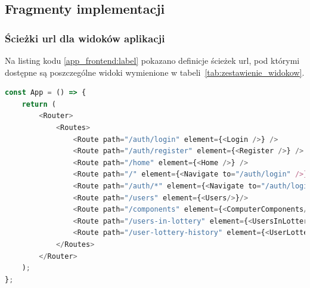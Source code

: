 \subsection{Fragmenty implementacji}
	\subsubsection{Ścieżki url dla widoków aplikacji}
	Na listing kodu \ref{app_frontend:label} pokazano definicje ścieżek url, pod którymi dostępne są poszczególne widoki wymienione w tabeli~\ref{tab:zestawienie_widokow}.
\begin{lstlisting}[language=JavaScript, style=JavaScriptStyle,  caption={Zdefiniowane ścieżki url widoków systemu }, label={app_frontend:label}]
	const App = () => {
    return (
        <Router>
            <Routes>
                <Route path="/auth/login" element={<Login />} />
                <Route path="/auth/register" element={<Register />} />
                <Route path="/home" element={<Home />} />
                <Route path="/" element={<Navigate to="/auth/login" />} />
                <Route path="/auth/*" element={<Navigate to="/auth/login" />} />
                <Route path="/users" element={<Users/>}/>
                <Route path="/components" element={<ComputerComponents/>}/>
                <Route path="/users-in-lottery" element={<UsersInLottery/>}/>
                <Route path="/user-lottery-history" element={<UserLotteryHistory/>}/>
            </Routes>
        </Router>
    );
};
\end{lstlisting}


